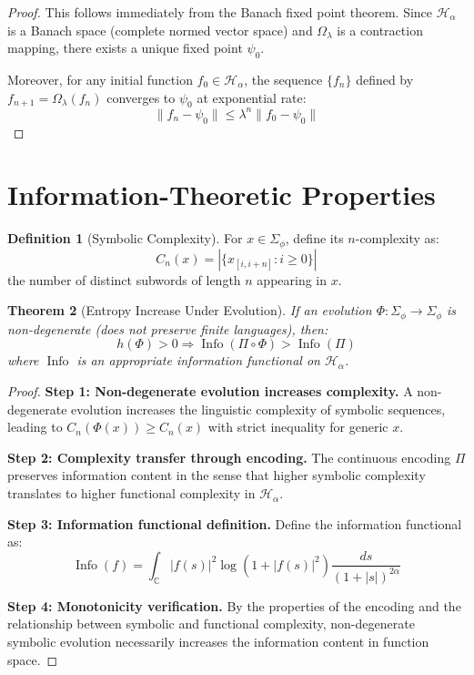 \documentclass[12pt]{article}
\theoremstyle{plain}
\newtheorem{theorem}{Theorem}[section]
\theoremstyle{definition}
\newtheorem{definition}[theorem]{Definition}
\DeclareMathOperator{\Info}{Info}
\begin{document}
\begin{proof}
This follows immediately from the Banach fixed point theorem. Since $\mathcal{H}_\alpha$ is a Banach space (complete normed vector space) and $\Omega_\lambda$ is a contraction mapping, there exists a unique fixed point $\psi_0$.

Moreover, for any initial function $f_0 \in \mathcal{H}_\alpha$, the sequence $\{f_n\}$ defined by $f_{n+1} = \Omega_\lambda(f_n)$ converges to $\psi_0$ at exponential rate:
$$\|f_n - \psi_0\| \leq \lambda^n \|f_0 - \psi_0\|$$
\end{proof}

\section{Information-Theoretic Properties}

\begin{definition}[Symbolic Complexity]
For $x \in \Sigma_\phi$, define its $n$-complexity as:
$$C_n(x) = |\{x_{[i,i+n]} : i \geq 0\}|$$
the number of distinct subwords of length $n$ appearing in $x$.
\end{definition}

\begin{theorem}[Entropy Increase Under Evolution]
\label{thm:entropy-increase}
If an evolution $\Phi: \Sigma_\phi \to \Sigma_\phi$ is non-degenerate (does not preserve finite languages), then:
$$h(\Phi) > 0 \Rightarrow \Info(\Pi \circ \Phi) > \Info(\Pi)$$
where $\Info$ is an appropriate information functional on $\mathcal{H}_\alpha$.
\end{theorem}

\begin{proof}
\textbf{Step 1: Non-degenerate evolution increases complexity.}
A non-degenerate evolution increases the linguistic complexity of symbolic sequences, leading to $C_n(\Phi(x)) \geq C_n(x)$ with strict inequality for generic $x$.

\textbf{Step 2: Complexity transfer through encoding.}
The continuous encoding $\Pi$ preserves information content in the sense that higher symbolic complexity translates to higher functional complexity in $\mathcal{H}_\alpha$.

\textbf{Step 3: Information functional definition.}
Define the information functional as:
$$\Info(f) = \int_{\mathbb{C}} |f(s)|^2 \log(1 + |f(s)|^2) \frac{ds}{(1+|s|)^{2\alpha}}$$

\textbf{Step 4: Monotonicity verification.}
By the properties of the encoding and the relationship between symbolic and functional complexity, non-degenerate symbolic evolution necessarily increases the information content in function space.
\end{proof}
\end{document}
